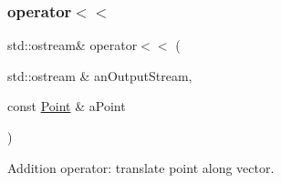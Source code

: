 \subsubsection{\texorpdfstring{operator$<$$<$}{operator<<}}
{\footnotesize\ttfamily std\+::ostream\& operator$<$$<$ (\begin{DoxyParamCaption}\item[{std\+::ostream \&}]{an\+Output\+Stream,  }\item[{const \hyperlink{classlibrary_1_1math_1_1geom_1_1d3_1_1objects_1_1_point}{Point} \&}]{a\+Point }\end{DoxyParamCaption})\hspace{0.3cm}{\ttfamily [friend]}}



Addition operator\+: translate point along vector. 


